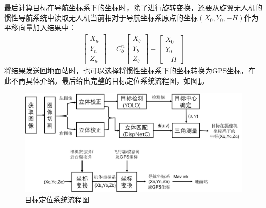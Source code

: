 最后计算目标在导航坐标系下的坐标时，除了进行旋转变换，还要从旋翼无人机的惯性导航系统中读取无人机当前相对于导航坐标系原点的坐标$(X_0, Y_0, -H)$作为平移向量加入结果中：
%
\begin{eqnarray}
\begin{bmatrix}
X_n \\ Y_n \\ Z_n
\end{bmatrix}
= C_b^n
\begin{bmatrix}
X_b \\ Y_b \\ Z_b
\end{bmatrix}
+
\begin{bmatrix}
X_0 \\ Y_0 \\ -H
\end{bmatrix}
\end{eqnarray}
将结果发送回地面站时，也可以选择将惯性坐标系下的坐标转换为GPS坐标，在此不再具体介绍。最后给出完整的目标定位系统流程图，如图\ref{fig:5_2_目标定位系统流程图}。

\begin{figure}[htb] %
	\centering
	\includegraphics[width=6in]{figures/5_2_目标定位系统流程图}
	\caption{目标定位系统流程图}\label{fig:5_2_目标定位系统流程图}
\end{figure}

\newpage
